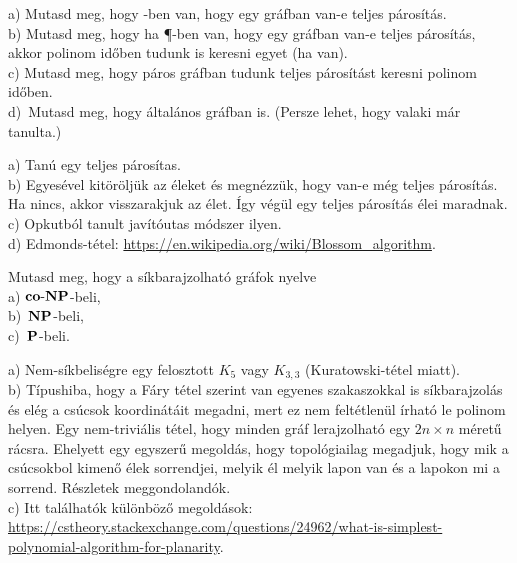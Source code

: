 \begin{Exercise}[counter={sorszam}, difficulty=0]
	a) Mutasd meg, hogy \NP-ben van, hogy egy gr\'afban van-e teljes p\'aros\'it\'as.\\
	b) Mutasd meg, hogy ha \P-ben van, hogy egy gr\'afban van-e teljes p\'aros\'it\'as, akkor polinom id\H oben tudunk is keresni egyet (ha van).\\
	c) Mutasd meg, hogy p\'aros gr\'afban tudunk teljes p\'aros\'it\'ast keresni polinom id\H oben.\\
	d)~\veryhard Mutasd meg, hogy \'altal\'anos gr\'afban is. (Persze lehet, hogy valaki m\'ar tanulta.)
\end{Exercise}	
\begin{Answer}
	a) Tan\'u egy teljes p\'aros\'itas.\\
	b) Egyes\'evel kit\"or\"olj\"uk az \'eleket \'es megn\'ezz\"uk, hogy van-e m\'eg teljes p\'aros\'it\'as. Ha nincs, akkor visszarakjuk az \'elet. \'Igy v\'eg\"ul egy teljes p\'aros\'it\'as \'elei maradnak.\\
	c) Opkutb\'ol tanult jav\'it\'outas m\'odszer ilyen.\\
	d) Edmonds-t\'etel: \url{https://en.wikipedia.org/wiki/Blossom_algorithm}.
\end{Answer}

\begin{Exercise}[counter={sorszam}, difficulty=0]
	Mutasd meg, hogy a s\'ikbarajzolhat\'o gr\'afok nyelve\\
	a) $\coNP$-beli,\\
	b)~\hard $\NP$-beli,\\
	c)~\veryhard $\P$-beli.
\end{Exercise}	
\begin{Answer}
	a) Nem-s\'ikbelis\'egre egy felosztott $K_5$ vagy $K_{3,3}$ (Kuratowski-t\'etel miatt).\\
	b) T\'ipushiba, hogy a F\'ary t\'etel szerint van egyenes szakaszokkal is s\'ikbarajzol\'as \'es el\'eg a cs\'ucsok koordin\'at\'ait megadni, mert ez nem felt\'etlen\"ul \'irhat\'o le polinom helyen. Egy nem-trivi\'alis t\'etel, hogy minden gr\'af lerajzolhat\'o egy $2n\times n$ m\'eret\H u r\'acsra. Ehelyett egy egyszer\H u megold\'as, hogy topol\'ogiailag megadjuk, hogy mik a cs\'ucsokbol kimen\H o \'elek sorrendjei, melyik \'el melyik lapon van \'es a lapokon mi a sorrend. R\'eszletek meggondoland\'ok.\\
	c) Itt tal\'alhat\'ok k\"ul\"onb\"oz\H o megold\'asok: \url{https://cstheory.stackexchange.com/questions/24962/what-is-simplest-polynomial-algorithm-for-planarity}.
\end{Answer}


